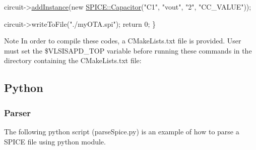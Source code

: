 \begin{DoxyCodeInclude}
    circuit->\hyperlink{class_s_p_i_c_e_1_1_circuit_a7bb4a4532643568ab1ac2c229185a88e}{addInstance}(\textcolor{keyword}{new} \hyperlink{class_s_p_i_c_e_1_1_capacitor}{SPICE::Capacitor}(\textcolor{stringliteral}{"C1"}, \textcolor{stringliteral}{"vout"}, \textcolor{stringliteral}{"2"}, \textcolor{stringliteral}{"CC\_VALUE"}));

    circuit->writeToFile(\textcolor{stringliteral}{"./myOTA.spi"});
    \textcolor{keywordflow}{return} 0;
\}

\end{DoxyCodeInclude}


\begin{DoxyNote}{Note}
In order to compile these codes, a C\+Make\+Lists.\+txt file is provided. User must set the \$\+V\+L\+S\+I\+S\+A\+P\+D\+\_\+\+T\+OP variable before running these commands in the directory containing the C\+Make\+Lists.\+txt file\+: 
\begin{DoxyCode}
\end{DoxyCode}

\end{DoxyNote}
\hypertarget{spice_spicePython}{}\subsection{Python}\label{spice_spicePython}
\hypertarget{spice_spiceParsePython}{}\subsubsection{Parser}\label{spice_spiceParsePython}
The following python script ({\ttfamily parse\+Spice.\+py}) is an example of how to parse a S\+P\+I\+CE file using python module. 
